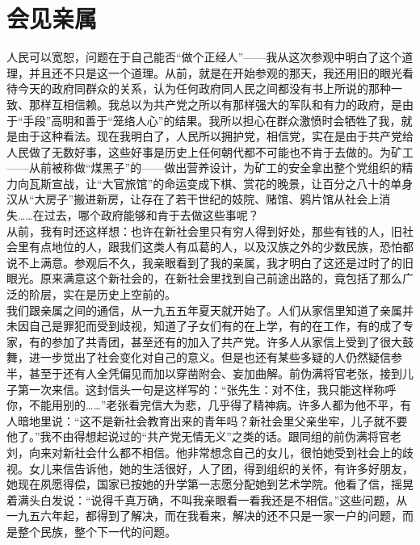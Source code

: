 \fancyhead[RO]{} %
\fancyhead[LE]{} %
\chapter*{会见亲属}
\thispagestyle{empty}
人民可以宽恕，问题在于自己能否“做个正经人”——我从这次参观中明白了这个道理，并且还不只是这一个道理。从前，就是在开始参观的那天，我还用旧的眼光看待今天的政府同群众的关系，认为任何政府同人民之间都没有书上所说的那种一致、那样互相信赖。我总以为共产党之所以有那样强大的军队和有力的政府，是由于“手段”高明和善于“笼络人心”的结果。我所以担心在群众激愤时会牺牲了我，就是由于这种看法。现在我明白了，人民所以拥护党，相信党，实在是由于共产党给人民做了无数好事，这些好事是历史上任何朝代都不可能也不肯于去做的。为矿工——从前被称做“煤黑子”的——做出营养设计，为矿工的安全拿出整个党组织的精力向瓦斯宣战，让“大官旅馆”的命运变成下棋、赏花的晚景，让百分之八十的单身汉从“大房子”搬进新房，让存在了若干世纪的妓院、赌馆、鸦片馆从社会上消失……在过去，哪个政府能够和肯于去做这些事呢？　\\

从前，我有时还这样想：也许在新社会里只有穷人得到好处，那些有钱的人，旧社会里有点地位的人，跟我们这类人有瓜葛的人，以及汉族之外的少数民族，恐怕都说不上满意。参观后不久，我亲眼看到了我的亲属，我才明白了这还是过时了的旧眼光。原来满意这个新社会的，在新社会里找到自己前途出路的，竟包括了那么广泛的阶层，实在是历史上空前的。\\

我们跟亲属之间的通信，从一九五五年夏天就开始了。人们从家信里知道了亲属并未因自己是罪犯而受到歧视，知道了子女们有的在上学，有的在工作，有的成了专家，有的参加了共青团，甚至还有的加入了共产党。许多人从家信上受到了很大鼓舞，进一步觉出了社会变化对自己的意义。但是也还有某些多疑的人仍然疑信参半，甚至于还有人全凭偏见而加以穿凿附会、妄加曲解。前伪满将官老张，接到儿子第一次来信。这封信头一句是这样写的：“张先生：对不住，我只能这样称呼你，不能用别的……”老张看完信大为悲，几乎得了精神病。许多人都为他不平，有人暗地里说：“这不是新社会教育出来的青年吗？新社会里父亲坐牢，儿子就不要他了。”我不由得想起说过的“共产党无情无义”之类的话。跟同组的前伪满将官老刘，向来对新社会什么都不相信。他非常想念自己的女儿，很怕她受到社会上的歧视。女儿来信告诉他，她的生活很好，人了团，得到组织的关怀，有许多好朋友，她现在夙愿得偿，国家已按她的升学第一志愿分配她到艺术学院。他看了信，摇晃着满头白发说：“说得千真万确，不叫我亲眼看一看我还是不相信。”这些问题，从一九五六年起，都得到了解决，而在我看来，解决的还不只是一家一户的问题，而是整个民族，整个下一代的问题。\\

